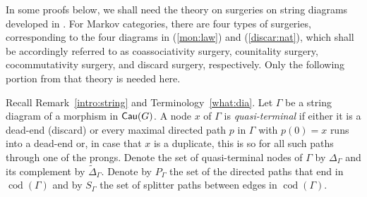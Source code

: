 \documentclass[12pt]{amsart}
\theoremstyle{plain}
\theoremstyle{definition}
\theoremstyle{remark}
\numberwithin{equation}{section}
\theoremstyle{plain}
\DeclareMathOperator{\cod}{cod}
\newcommand{\0}{\emptyset}
\DeclareMathOperator{\cau}{\sf{Cau}}
\newcommand{\memph}[1]{{\color{magenta}\emph{#1}}}
\begin{document}
In some proofs below, we shall need the theory on surgeries on string diagrams developed in \cite{YinZhangModularity}. For Markov categories, there are four types of surgeries, corresponding to the four diagrams in (\ref{mon:law}) and (\ref{discar:nat}), which shall be accordingly referred to as coassociativity surgery,  counitality surgery,  cocommutativity surgery,  and  discard surgery,  respectively.   Only the following portion from that theory is needed here.

Recall Remark~\ref{intro:string} and Terminology~\ref{what:dia}.  Let $\Gamma$ be a string diagram of a morphism in $\cau(G)$.  A node $x$ of  $\Gamma$ is \memph{quasi-terminal} if either it is a dead-end (discard) or every maximal directed path $p$ in $\Gamma$ with $p(0) = x$  runs into a dead-end or, in case that $x$ is a duplicate, this is so for all such paths through one of the prongs.  Denote the set of quasi-terminal nodes of $\Gamma$ by $\Delta_\Gamma$ and its complement by  $\tilde \Delta_\Gamma$.  Denote by $P_\Gamma$ the set of the directed paths that end in  $\cod(\Gamma)$ and by $S_\Gamma$ the set of splitter paths between edges in $\cod(\Gamma)$.
\end{document}
